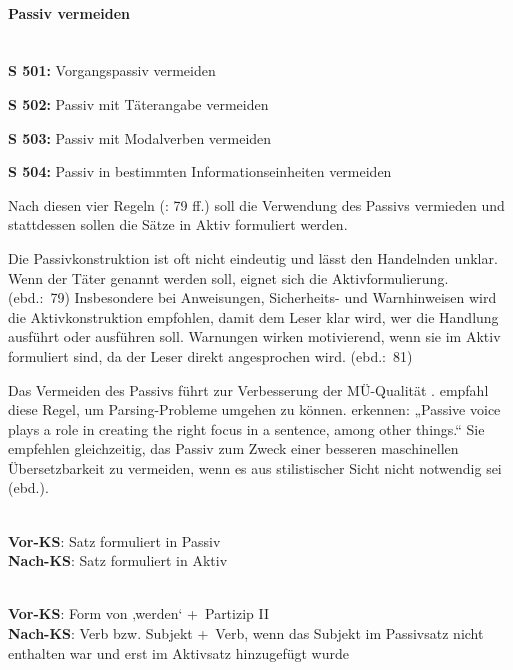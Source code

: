 \paragraph*{Passiv vermeiden}~\\

\textbf{S 501:} Vorgangspassiv vermeiden

\textbf{S 502:} Passiv mit Täterangabe vermeiden

\textbf{S 503:} Passiv mit Modalverben vermeiden

\textbf{S 504:} Passiv in bestimmten Informationseinheiten vermeiden

Nach diesen vier Regeln (\citealt{tekom2013}: 79 ff.) soll die Verwendung des Passivs vermieden und stattdessen sollen die Sätze in Aktiv formuliert werden.

\begin{description}[font=\normalfont\bfseries]
\item[Begründung der Anwendung laut tekom:] Die Passivkonstruktion ist oft nicht eindeutig und lässt den Handelnden unklar. Wenn der Täter genannt werden soll, eignet sich die Aktivformulierung. (ebd.:~79) Insbesondere bei Anweisungen, Sicherheits- und Warnhinweisen wird die Aktivkonstruktion empfohlen, damit dem Leser klar wird, wer die Handlung ausführt oder ausführen soll. Warnungen wirken motivierend, wenn sie im Aktiv formuliert sind, da der Leser direkt angesprochen wird. (ebd.:~81)

\item[{\parbox[t]{\textwidth}{Begründung der Anwendung bzw. die gezielte Wirkung der Regel laut vorhe-\\rigen Studien:}}] Das Vermeiden des Passivs führt zur Verbesserung der MÜ-Qualität \citep{Siegel2013}.\footnotemark{} \citet{Reuther2003} empfahl diese Regel, um Parsing-Probleme umgehen zu können.  \citet[190]{BernthGdaniec2001} erkennen: „Passive voice plays a role in creating the right focus in a sentence, among other things.“ Sie empfehlen gleichzeitig, das Passiv zum Zweck einer besseren maschinellen Übersetzbarkeit zu vermeiden, wenn es aus stilistischer Sicht nicht notwendig sei (ebd.).

\item[Umsetzungsmuster:]
~ \\
\textbf{Vor-KS}: Satz formuliert in Passiv\\
\textbf{Nach-KS}: Satz formuliert in Aktiv

\item[KS-Stelle:]
~ \\
\textbf{Vor-KS}: Form von ‚werden‘ +~Partizip II\\
\textbf{Nach-KS}: Verb bzw. Subjekt +~Verb, wenn das Subjekt im Passivsatz nicht enthalten war und erst im Aktivsatz hinzugefügt wurde


\end{description}
